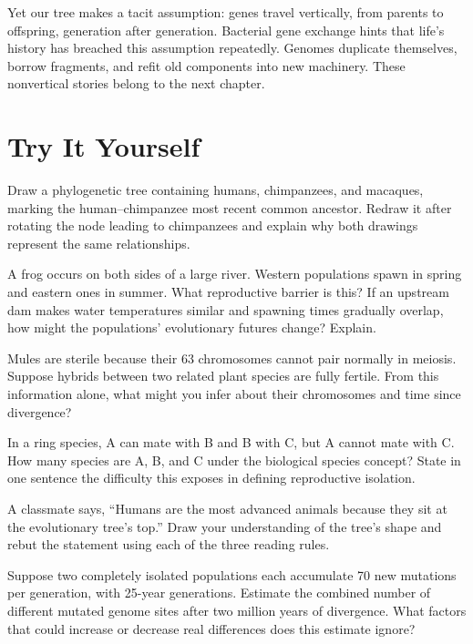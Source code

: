Yet our tree makes a tacit assumption: genes travel vertically, from parents to offspring, generation after generation. Bacterial gene exchange hints that life's history has breached this assumption repeatedly. Genomes duplicate themselves, borrow fragments, and refit old components into new machinery. These nonvertical stories belong to the next chapter.

\section*{Try It Yourself}

\begin{sikaoti}
\item Draw a phylogenetic tree containing humans, chimpanzees, and macaques, marking the human--chimpanzee most recent common ancestor. Redraw it after rotating the node leading to chimpanzees and explain why both drawings represent the same relationships.
\item A frog occurs on both sides of a large river. Western populations spawn in spring and eastern ones in summer. What reproductive barrier is this? If an upstream dam makes water temperatures similar and spawning times gradually overlap, how might the populations' evolutionary futures change? Explain.
\item Mules are sterile because their 63 chromosomes cannot pair normally in meiosis. Suppose hybrids between two related plant species are fully fertile. From this information alone, what might you infer about their chromosomes and time since divergence?
\item In a ring species, A can mate with B and B with C, but A cannot mate with C. How many species are A, B, and C under the biological species concept? State in one sentence the difficulty this exposes in defining reproductive isolation.
\item A classmate says, ``Humans are the most advanced animals because they sit at the evolutionary tree's top.'' Draw your understanding of the tree's shape and rebut the statement using each of the three reading rules.
\item Suppose two completely isolated populations each accumulate 70 new mutations per generation, with 25-year generations. Estimate the combined number of different mutated genome sites after two million years of divergence. What factors that could increase or decrease real differences does this estimate ignore?
\end{sikaoti}
